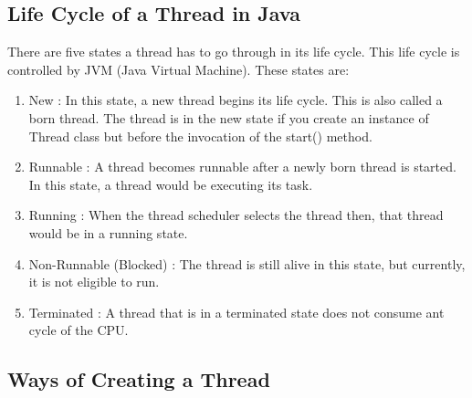 \documentclass[11pt]{article}
\begin{document}
\subsection{Life Cycle of a Thread in Java}
There are five states a thread has to go through in its life cycle. This life cycle is controlled by JVM (Java Virtual Machine). These states are:
\begin{enumerate}
	\item New : In this state, a new thread begins its life cycle. This is also called a born thread. The thread is in the new state if you create an instance of Thread class but before the invocation of the start() method.
	\item Runnable : A thread becomes runnable after a newly born thread is started. In this state, a thread would be executing its task.
	\item Running : When the thread scheduler selects the thread then, that thread would be in a running state.
	\item Non-Runnable (Blocked) : The thread is still alive in this state, but currently, it is not eligible to run.
	\item Terminated : A thread that is in a terminated state does not consume ant cycle of the CPU.
\end{enumerate}

\subsection{Ways of Creating a Thread}

\end{document}
